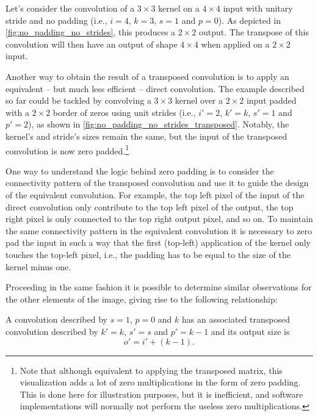 Let's consider the convolution of a $3 \times 3$ kernel on a $4 \times 4$
input with unitary stride and no padding (i.e., $i = 4$, $k = 3$, $s = 1$ and
$p = 0$). As depicted in \autoref{fig:no_padding_no_strides}, this produces a
$2 \times 2$ output. The transpose of this convolution will then have an output
of shape $4 \times 4$ when applied on a $2 \times 2$ input.

Another way to obtain the result of a transposed convolution is to apply an
equivalent -- but much less efficient -- direct convolution. The example
described so far could be tackled by convolving a $3 \times 3$ kernel over a
$2 \times 2$ input padded with a $2 \times 2$ border of zeros using unit
strides (i.e., $i' = 2$, $k' = k$, $s' = 1$ and $p' = 2$), as shown in
\autoref{fig:no_padding_no_strides_transposed}. Notably, the kernel's and
stride's sizes remain the same, but the input of the transposed convolution is
now zero padded.\footnote{Note that although
    equivalent to applying the transposed matrix, this visualization adds a lot
    of zero multiplications in the form of zero padding.  This is done here for
    illustration purposes, but it is inefficient, and software implementations
    will normally not perform the useless zero multiplications.}

One way to understand the logic behind zero padding is to consider the
connectivity pattern of the transposed convolution and use it to guide the
design of the equivalent convolution. For example, the top left pixel of the
input of the direct convolution only contribute to the top left pixel of the
output, the top right pixel is only connected to the top right output pixel,
and so on. To maintain the same connectivity pattern in the equivalent
convolution it is necessary to zero pad the input in such a way that the first
(top-left) application of the kernel only touches the top-left pixel, i.e., the
padding has to be equal to the size of the kernel minus one.

Proceeding in the same fashion it is possible to determine similar observations
for the other elements of the image, giving rise to the following relationship:

\begin{relationship}\label{rel:no_padding_no_strides_transposed}
A convolution described by $s = 1$, $p = 0$ and $k$ has an associated
transposed convolution described by $k' = k$, $s' = s$ and $p' = k - 1$ and its
output size is
\begin{equation*}
    o' = i' + (k - 1).
\end{equation*}
\end{relationship}

